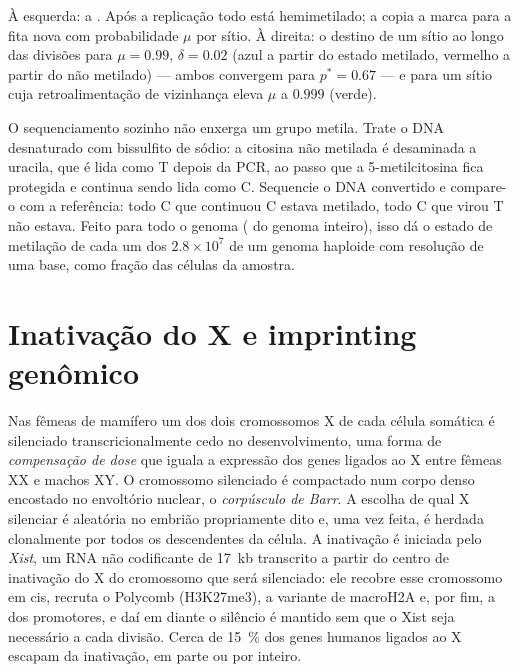 \begin{omfigure}
{\small À esquerda: a . Após a replicação todo
 está hemimetilado; a  copia a marca para a fita nova com
probabilidade $\mu$ por sítio. À direita: o destino de um sítio ao
longo das divisões para $\mu = 0.99$, $\delta = 0.02$ (azul a partir
do estado metilado, vermelho a partir do não metilado) --- ambos
convergem para $p^{*} = 0.67$ --- e para um sítio cuja
retroalimentação de vizinhança eleva $\mu$ a $0.999$ (verde).}
\end{omfigure}

\begin{method}\label{met:b3:chromatin-epigenetics:bisulfite}
O sequenciamento sozinho não enxerga um grupo metila. Trate o DNA
desnaturado com bissulfito de sódio: a citosina não metilada é
desaminada a uracila, que é lida como T depois da PCR, ao passo que a
5-metilcitosina fica protegida e continua sendo lida como C.
Sequencie o DNA convertido e compare-o com a referência: todo C que
continuou C estava metilado, todo C que virou T não estava. Feito para
todo o genoma ( do genoma inteiro), isso
dá o estado de metilação de cada um dos $2.8\times 10^{7}$  de um
genoma haploide com resolução de uma base, como fração das células da
amostra.
\end{method}

\section{Inativação do X e imprinting genômico}

\begin{definition}\label{def:b3:chromatin-epigenetics:x-inactivation}
Nas fêmeas de mamífero um dos dois cromossomos X de cada célula
somática é silenciado transcricionalmente cedo no desenvolvimento, uma
forma de \emph{compensação de dose} que iguala a expressão dos genes
ligados ao X entre fêmeas XX e machos XY. O cromossomo silenciado é
compactado num corpo denso encostado no envoltório nuclear, o
\emph{corpúsculo de Barr}. A escolha de qual X silenciar é aleatória
no embrião propriamente dito e, uma vez feita, é herdada clonalmente
por todos os descendentes da célula. A inativação é iniciada pelo
\emph{Xist}, um RNA não codificante de \qty{17}{kb} transcrito a
partir do centro de inativação do X do cromossomo que será silenciado:
ele recobre esse cromossomo em cis, recruta o Polycomb (H3K27me3), a
variante de  macroH2A e, por fim, a  dos
promotores, e daí em diante o silêncio é mantido sem que o Xist seja
necessário a cada divisão. Cerca de \qty{15}{\%} dos genes humanos
ligados ao X escapam da inativação, em parte ou por inteiro.
\end{definition}

